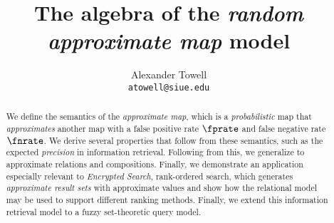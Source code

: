 \documentclass[11pt,final,hidelinks]{article}
\title
{
    The algebra of the \emph{random approximate map} model
}
\author
{
    Alexander Towell\\
    \texttt{atowell@siue.edu}
}
\date{}
\begin{document}
\maketitle
\begin{abstract}
We define the semantics of the \emph{approximate map}, which is a \emph{probabilistic} map that \emph{approximates} another map with a false positive rate $\fprate$ and false negative rate $\fnrate$. We derive several properties that follow from these semantics, such as the expected \emph{precision} in information retrieval. Following from this, we generalize to approximate relations and compositions. Finally, we demonstrate an application especially relevant to \emph{Encrypted Search}, rank-ordered search, which generates \emph{approximate result sets} with approximate values and show how the relational model may be used to support different ranking methods. Finally, we extend this information retrieval model to a fuzzy set-theoretic query model.
\end{abstract}

\tableofcontents







%

%
%
%
%
\printglossary

\end{document}
